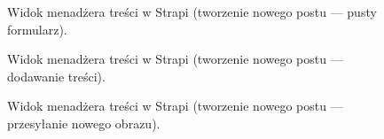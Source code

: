 \documentclass[a4paper, 12pt]{article}
\numberwithin{figure}{section}
\begin{document}
\begin{sloppypar}
\begin{figure}[H] 
    \centering
   \caption{Widok menadżera treści w Strapi (tworzenie nowego postu --- pusty formularz).}
   \label{fig:strapi-use-2.jpg}
\end{figure}

\begin{figure}[H] 
    \centering
   \caption{Widok menadżera treści w Strapi (tworzenie nowego postu --- dodawanie treści).}
   \label{fig:strapi-use-3.jpg}
\end{figure}

\begin{figure}[H] 
    \centering
   \caption{Widok menadżera treści w Strapi (tworzenie nowego postu --- przesyłanie nowego obrazu).}
   \label{fig:strapi-use-4.jpg}
\end{figure}


\end{sloppypar}
\end{document}
